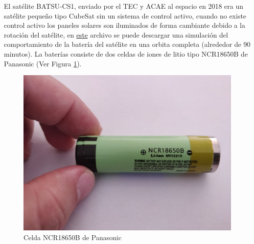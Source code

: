 \documentclass[12pt]{article}
\begin{document}
\setlength{\parindent}{0em}

El satélite BATSU-CS1, enviado por el TEC y ACAE al espacio en 2018 era un satélite pequeño tipo CubeSat sin un sistema de control activo, cuando no existe control activo los paneles solares son iluminados de forma cambiante debido a la rotación del satélite, en \href{https://estudianteccr-my.sharepoint.com/:x:/g/personal/prof_juan_rojas_estudiantec_cr/ETTDDKfo78RMnVB7k3jrQuIBsd2N6uON5U7eSBfSzcLbxw?e=nt5Cpk}{este} archivo se puede descargar una simulación del comportamiento de la batería del satélite en una orbita completa (alrededor de 90 minutos). La baterías consiste de dos celdas de iones de litio tipo NCR18650B de Panasonic (Ver Figura \ref{fig:18650}). 

\begin{figure}[H]
    \centering
    \includegraphics[width=0.6\linewidth]{fig/NCR18650.jpeg}
    \caption{Celda NCR18650B de Panasonic}
    \label{fig:18650}
\end{figure}
\end{document}
